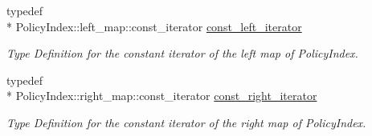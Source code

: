 \begin{DoxyCompactItemize}
typedef \\*
Policy\-Index\-::left\-\_\-map\-::const\-\_\-iterator \hyperlink{classns3_1_1NamedContentCache_a061b957fbf37ee4eb873db49705bc388}{const\-\_\-left\-\_\-iterator}
\begin{DoxyCompactList}\small\item\em Type Definition for the constant iterator of the left map of Policy\-Index. \end{DoxyCompactList}\item 
typedef \\*
Policy\-Index\-::right\-\_\-map\-::const\-\_\-iterator \hyperlink{classns3_1_1NamedContentCache_a7489e77c6528954d887b8ff107a1244f}{const\-\_\-right\-\_\-iterator}
\begin{DoxyCompactList}\small\item\em Type Definition for the constant iterator of the right map of Policy\-Index. \end{DoxyCompactList}\end{DoxyCompactItemize}
